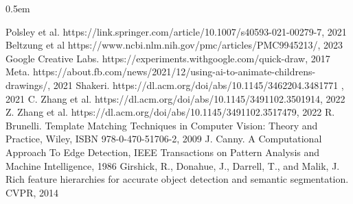 \documentclass[11pt,a4paper,titlepage,final,table]{article}
\begin{document}
\maketitle
\clearpage
{}
\setcounter{page}{2}
\pagestyle{plain}
\parskip 0.5em





{}

\lstset{
	basicstyle=\ttfamily\small,
	keywordstyle=\bfseries,
	language=[Sharp]C
}



%






\newpage

\begin{thebibliography}{2}
Polsley et al. https://link.springer.com/article/10.1007/s40593-021-00279-7, 2021
Beltzung et al https://www.ncbi.nlm.nih.gov/pmc/articles/PMC9945213/, 2023
Google Creative Labs. https://experiments.withgoogle.com/quick-draw, 2017 
Meta. https://about.fb.com/news/2021/12/using-ai-to-animate-childrens-drawings/, 2021
Shakeri. https://dl.acm.org/doi/abs/10.1145/3462204.3481771 , 2021
C. Zhang et al. https://dl.acm.org/doi/abs/10.1145/3491102.3501914, 2022
Z. Zhang et al. https://dl.acm.org/doi/abs/10.1145/3491102.3517479, 2022
R. Brunelli. Template Matching Techniques in Computer Vision: Theory and Practice, Wiley, ISBN 978-0-470-51706-2, 2009
J. Canny. A Computational Approach To Edge Detection, IEEE Transactions on Pattern Analysis and Machine Intelligence, 1986
Girshick, R., Donahue, J., Darrell, T., and Malik, J. Rich feature hierarchies
for accurate object detection and semantic segmentation. CVPR, 2014
\end{thebibliography}
\end{document}
